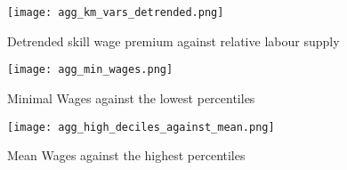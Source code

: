 \documentclass{article}
\begin{document}
\begin{figure}[!htbp]%
    \centering
    {\texttt{[image: agg\_km\_vars\_detrended.png]} }
    \caption{Detrended skill wage premium against relative labour supply}
    \label{agg_km_vars_detrended}
\end{figure}



\begin{figure}[!htbp]%
    \centering
    {\texttt{[image: agg\_min\_wages.png]} }
    \caption{Minimal Wages against the lowest percentiles}
    \label{low_deciles_vs_min_w}
\end{figure}

\begin{figure}[!htbp]%
    \centering
    {\texttt{[image: agg\_high\_deciles\_against\_mean.png]} }
    \caption{Mean Wages against the highest percentiles}
    \label{high_deciles_vs_meam_w}
\end{figure}
\end{document}
